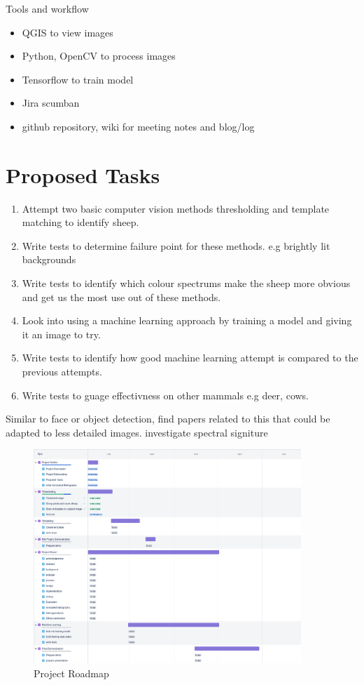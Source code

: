 \documentclass[11pt,fleqn,twoside]{article}
\begin{document}
Tools and workflow

\begin{itemize}
    \item QGIS to view images
    \item Python, OpenCV to process images
    \item Tensorflow to train model
    \item Jira scumban 
    \item github repository, wiki for meeting notes and blog/log
\end{itemize}

\section{Proposed Tasks}
\begin{enumerate}
    \item Attempt two basic computer vision methods thresholding and template matching to identify sheep. 
    \item Write tests to determine failure point for these methods. e.g brightly lit backgrounds
    \item Write tests to identify which colour spectrums make the sheep more obvious and get us the most use out of these methods.
    \item Look into using a machine learning approach by training a model and giving it an image to try. 
    \item Write tests to identify how good machine learning attempt is compared to the previous attempts.
    \item Write tests to guage effectivness on other mammals e.g deer, cows.
\end{enumerate}


Similar to face or object detection, find papers related to this that could be adapted to less detailed images.
investigate spectral signiture

\begin{figure}[ht]
    \caption{Project Roadmap}
    \center
    \includegraphics[width=0.9\textwidth]{where_smysheep_2020-02-07_0958am.png}
\end{figure}
\end{document}
